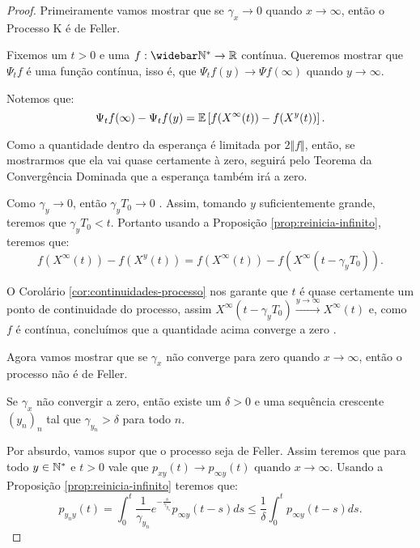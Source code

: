 \begin{proof}

  Primeiramente vamos mostrar que se $\gamma_x \to 0$ quando $x \to
  \infty$, então o Processo K é de Feller.

  Fixemos um $t > 0$ e uma $f: \Nzb \to \R$ contínua. Queremos mostrar
  que $\Psi_t f$ é uma função contínua, isso é, que $\Psi_t f(y) \to
  \Psi f (\infty)$ quando $y \to \infty$.

  Notemos que:
  \begin{displaymath}
    \Psi_t f(\infty) - \Psi_t f (y) =
    {\mathbb{E}} \left[
      f(X^\infty(t)) - f(X^y(t))
    \right].
  \end{displaymath}

  Como a quantidade dentro da esperança é limitada por $2 \Vert f
  \Vert$, então, se mostrarmos que ela vai quase certamente à zero,
  seguirá pelo Teorema da Convergência Dominada que a esperança também
  irá a zero.

  Como $\gamma_y \to 0$, então $\gamma_y T_0 \to 0$ \qc. Assim, tomando
  $y$ suficientemente grande, teremos que $\gamma_y T_0 < t$. Portanto
  usando a Proposição \ref{prop:reinicia-infinito}, teremos que:
  \begin{displaymath}
    f(X^\infty(t)) - f(X^y(t)) = 
    f(X^\infty(t)) - f(X^\infty(t-\gamma_y T_0)).
  \end{displaymath}

  O Corolário \ref{cor:continuidades-processo} nos garante que $t$ é
  quase certamente um ponto de continuidade do processo, assim
  $X^\infty(t-\gamma_y T_0) \xrightarrow{y\to\infty} X^\infty(t)$ \qc
  e, como $f$ é contínua, concluímos que a quantidade acima converge a
  zero \qc.

  Agora vamos mostrar que se $\gamma_x$ não converge para zero quando
  $x \to \infty$, então o processo não é de Feller.

  Se $\gamma_x$ não convergir a zero, então existe um $\delta > 0$ e
  uma sequência crescente $(y_n)_n$ tal que $\gamma_{y_n} > \delta$ para
  todo $n$.

  Por absurdo, vamos supor que o processo seja de Feller. Assim
  teremos que para todo $y \in {\mathbb{N^*}}$ e $t > 0$ vale que $p_{x y} (t)
  \to p_{\infty y} (t)$ quando $x \to \infty$. Usando a Proposição
  \ref{prop:reinicia-infinito} teremos que:
  \begin{displaymath}
    p_{y_n y}(t) = \int_0^t \frac{1}{\gamma_{y_n}}
    e^{-\frac{s}{\gamma_{y_n}}} p_{\infty y} (t-s) ds
    \leq \frac{1}{\delta} \int_0^t p_{\infty y} (t-s) d s.
  \end{displaymath}


\end{proof}
